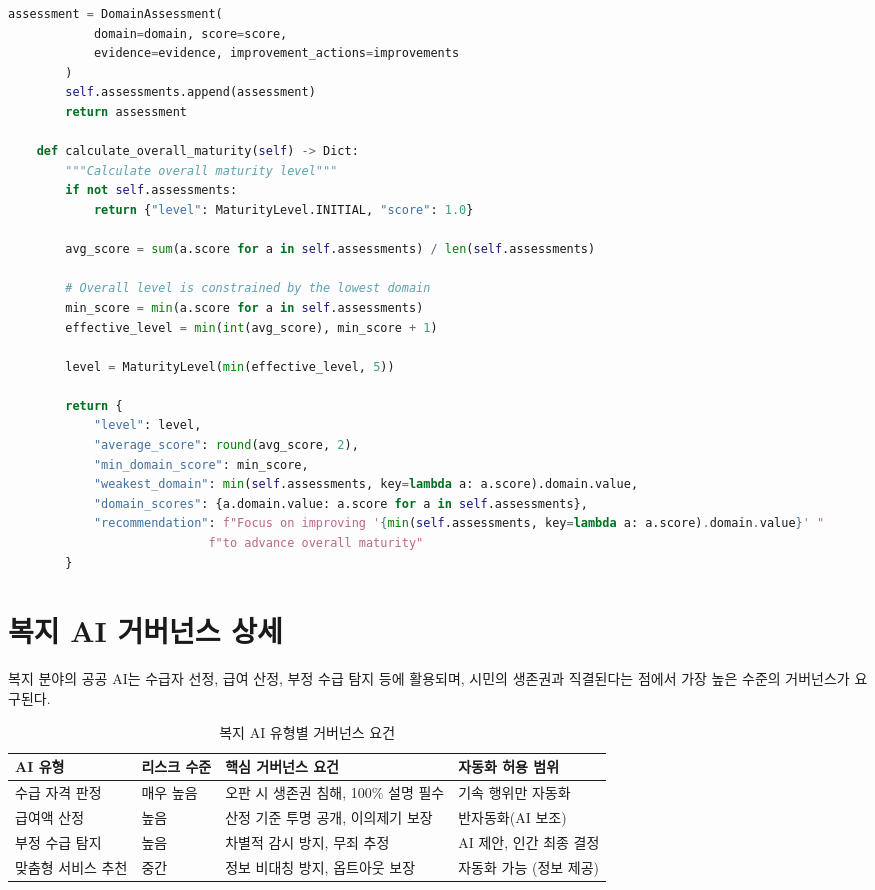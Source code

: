 \begin{lstlisting}[language=Python, caption={Public AI Governance Maturity Self-Assessment Tool}, label={lst:maturity}]
        assessment = DomainAssessment(
            domain=domain, score=score,
            evidence=evidence, improvement_actions=improvements
        )
        self.assessments.append(assessment)
        return assessment

    def calculate_overall_maturity(self) -> Dict:
        """Calculate overall maturity level"""
        if not self.assessments:
            return {"level": MaturityLevel.INITIAL, "score": 1.0}

        avg_score = sum(a.score for a in self.assessments) / len(self.assessments)

        # Overall level is constrained by the lowest domain
        min_score = min(a.score for a in self.assessments)
        effective_level = min(int(avg_score), min_score + 1)

        level = MaturityLevel(min(effective_level, 5))

        return {
            "level": level,
            "average_score": round(avg_score, 2),
            "min_domain_score": min_score,
            "weakest_domain": min(self.assessments, key=lambda a: a.score).domain.value,
            "domain_scores": {a.domain.value: a.score for a in self.assessments},
            "recommendation": f"Focus on improving '{min(self.assessments, key=lambda a: a.score).domain.value}' "
                            f"to advance overall maturity"
        }
\end{lstlisting}

\section{복지 AI 거버넌스 상세}
\label{sec:18.8}

복지 분야의 공공 AI는 수급자 선정, 급여 산정, 부정 수급 탐지 등에 활용되며, 시민의 생존권과 직결된다는 점에서 가장 높은 수준의 거버넌스가 요구된다.

\begin{table}[htbp]
\centering
\caption{복지 AI 유형별 거버넌스 요건}
\label{tab:18_welfare}
\begin{tabularx}{\textwidth}{p{2.5cm}p{2.5cm}Xp{3cm}}
\toprule
\textbf{AI 유형} & \textbf{리스크 수준} & \textbf{핵심 거버넌스 요건} & \textbf{자동화 허용 범위} \\
\midrule
수급 자격 판정 & 매우 높음 & 오판 시 생존권 침해, 100\% 설명 필수 & 기속 행위만 자동화 \\
급여액 산정 & 높음 & 산정 기준 투명 공개, 이의제기 보장 & 반자동화(AI 보조) \\
부정 수급 탐지 & 높음 & 차별적 감시 방지, 무죄 추정 & AI 제안, 인간 최종 결정 \\
맞춤형 서비스 추천 & 중간 & 정보 비대칭 방지, 옵트아웃 보장 & 자동화 가능 (정보 제공) \\
\bottomrule
\end{tabularx}
\end{table}

